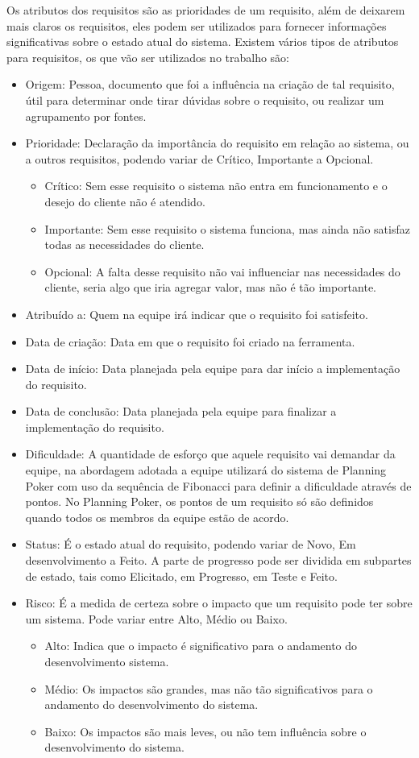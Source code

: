 Os atributos dos requisitos são as prioridades de um requisito, além de deixarem mais claros os requisitos, eles podem ser utilizados para fornecer informações significativas sobre o estado atual do sistema.  
Existem vários tipos de atributos para requisitos, os que vão ser utilizados no trabalho são:
\begin{itemize}
\item Origem: Pessoa, documento que foi a influência na criação de tal requisito, útil para determinar onde tirar dúvidas sobre o requisito, ou realizar um agrupamento por fontes.
\item Prioridade: Declaração da importância do requisito em relação ao sistema, ou a outros requisitos, podendo variar de Crítico, Importante a Opcional.
\begin{itemize}
\item Crítico: Sem esse requisito o sistema não entra em funcionamento e o desejo do cliente não é atendido.
\item Importante: Sem esse requisito o sistema funciona, mas ainda não satisfaz todas as necessidades do cliente.
\item Opcional: A falta desse requisito não vai influenciar nas necessidades do cliente, seria algo que iria agregar valor, mas não é tão importante.
\end{itemize}

\item Atribuído a: Quem na equipe irá indicar que o requisito foi satisfeito.
\item Data de criação: Data em que o requisito foi criado na ferramenta.
\item Data de início: Data planejada pela equipe para dar início a implementação do requisito.
\item Data de conclusão: Data planejada pela equipe para finalizar a implementação do requisito.
\item Dificuldade: A quantidade de esforço que aquele requisito vai demandar da equipe, na abordagem adotada a equipe utilizará do sistema de Planning Poker com uso da sequência de Fibonacci para definir a dificuldade através de pontos. No Planning Poker, os pontos de um requisito só são definidos quando todos os membros da equipe estão de acordo.
\item Status: É o estado atual do requisito, podendo variar de Novo, Em desenvolvimento a Feito. A parte de progresso pode ser dividida em subpartes de estado, tais como Elicitado, em Progresso, em Teste e Feito.

\item Risco: É a medida de certeza sobre o impacto que um requisito pode ter sobre um sistema. Pode variar entre Alto, Médio ou Baixo.
\begin{itemize}
\item Alto: Indica que o impacto é significativo para o andamento do desenvolvimento sistema.
\item Médio: Os impactos são grandes, mas não tão significativos para o andamento do desenvolvimento do sistema.
\item Baixo: Os impactos são mais leves, ou não tem influência sobre o desenvolvimento do sistema.
\end{itemize}
\end{itemize}